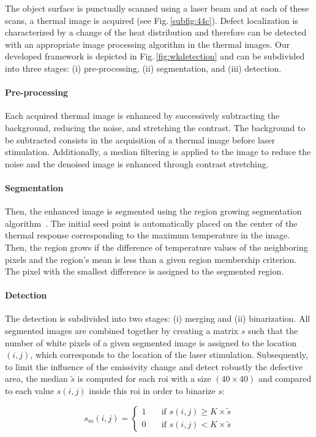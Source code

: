The object surface is punctually scanned using a laser beam and at each of these scans, a thermal image is acquired (see Fig.\,\ref{subfig:44c}).
Defect localization is characterized by a change of the heat distribution and therefore can be detected with an appropriate image processing algorithm in the thermal images.
Our developed framework is depicted in Fig.\,\ref{fig:wkdetection} and can be subdivided into three stages: (i) pre-processing, (ii) segmentation, and (iii) detection.

\paragraph{Pre-processing} Each acquired thermal image is enhanced by successively subtracting the background, reducing the noise, and stretching the contrast. The background to be subtracted consists in the acquisition of a thermal image before laser stimulation. Additionally, a median filtering is applied to the image to reduce the noise and the denoised image is enhanced through contrast stretching.
\paragraph{Segmentation} Then, the enhanced image is segmented using the region growing segmentation algorithm~\cite{Adams1994}. 
The initial seed point is automatically placed on the center of the thermal response corresponding to the maximum temperature in the image.
Then, the region grows if the difference of temperature values of the neighboring pixels and the region's mean is less than a given region membership criterion.
The pixel with the smallest difference is assigned to the segmented region.
\paragraph{Detection} The detection is subdivided into two stages: (i) merging and (ii) binarization.
All segmented images are combined together by creating a matrix $s$ such that the number of white pixels of a given segmented image is assigned to the location $(i,j)$, which corresponds to the location of the laser stimulation.
Subsequently, to limit the influence of the emissivity change and detect robustly the defective area, the median $\tilde{s}$ is computed for each \ac{roi} with a size $(40\times40)$ and compared to each value $s(i,j)$ inside this \ac{roi} in order to binarize $s$:

\begin{equation}
  \label{eq:3}
s_m(i,j) = \begin{cases}
1 & \quad \text{if } s(i,j) \geq K \times \tilde{s}\\
0 & \quad \text{if } s(i,j) < K \times \tilde{s}
\end{cases}
\end{equation}

